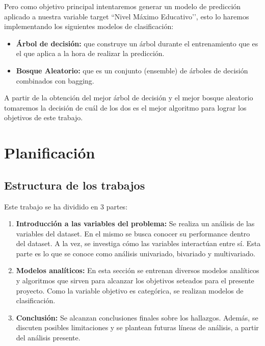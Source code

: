 \documentclass[a4paper]{article}
\begin{document}
        Pero como objetivo principal intentaremos generar un modelo de predicción aplicado a nuestra variable target ``Nivel Máximo Educativo’’, esto lo haremos implementando los siguientes modelos de clasificación:
        \begin{itemize}
            \item \textbf{Árbol de decisión:} que construye un árbol durante el entrenamiento que es el que aplica a la hora de realizar la predicción.
            \item \textbf{Bosque Aleatorio:} que es un conjunto (ensemble) de árboles de decisión combinados con bagging.
        \end{itemize}
        A partir de la obtención del mejor árbol de decisión y el mejor bosque aleatorio tomaremos la decisión de cuál de los dos es el mejor algoritmo para lograr los objetivos de este trabajo.

\newpage

\section{Planificación}

    \subsection*{Estructura de los trabajos}

        Este trabajo se ha dividido en 3 partes:
        \begin{enumerate}
            \item \textbf{Introducción a las variables del problema:} Se realiza un análisis de las variables del dataset. En el mismo se busca conocer su performance dentro del dataset. A la vez, se investiga cómo las variables interactúan entre sí. Esta parte es lo que se conoce como análisis univariado, bivariado y multivariado.
            \item \textbf{Modelos analíticos:} En esta sección se entrenan diversos modelos analíticos y algoritmos que sirven para alcanzar los objetivos seteados para el presente proyecto. Como la variable objetivo es categórica, se realizan modelos de clasificación.
            \item \textbf{Conclusión:} Se alcanzan conclusiones finales sobre los hallazgos. Además, se discuten posibles limitaciones y se plantean futuras líneas de análisis, a partir del análisis presente.
            
        \end{enumerate}
\end{document}
